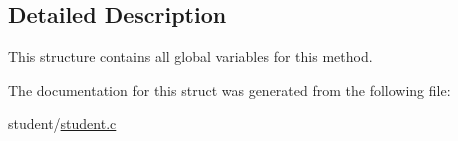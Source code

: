 \subsection{Detailed Description}
This structure contains all global variables for this method. 

The documentation for this struct was generated from the following file\+:\begin{DoxyCompactItemize}
\item 
student/\hyperlink{student_8c}{student.\+c}\end{DoxyCompactItemize}

